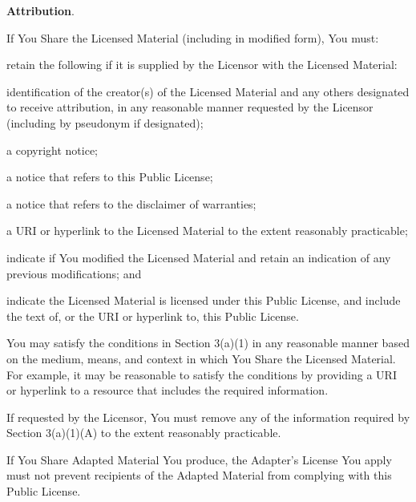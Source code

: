 \begin{doclicense@enumerate}
\item \par \textbf{Attribution}.
\begin{doclicense@enumerate}
\item \par If You Share the Licensed Material (including in modified form), You must:
\begin{doclicense@enumerate}
\item retain the following if it is supplied by the Licensor with the Licensed Material:
\begin{doclicense@enumerate}
\item identification of the creator(s) of the Licensed Material and any others designated to receive attribution, in any reasonable manner requested by the Licensor (including by pseudonym if designated);
\item a copyright notice;
\item a notice that refers to this Public License; 
\item a notice that refers to the disclaimer of warranties;
\item a URI or hyperlink to the Licensed Material to the extent reasonably practicable;
\end{doclicense@enumerate}
\item indicate if You modified the Licensed Material and retain an indication of any previous modifications; and
\item indicate the Licensed Material is licensed under this Public License,
and include the text of, or the URI or hyperlink to, this Public
License.
\end{doclicense@enumerate}

\item You may satisfy the conditions in Section 3(a)(1) in any reasonable manner based on the medium, means, and context in which You Share the Licensed Material. For example, it may be reasonable to satisfy the conditions by providing a URI or hyperlink to a resource that includes the required information.
\item If requested by the Licensor, You must remove any of the information required by Section 3(a)(1)(A) to the extent reasonably practicable.
\item If You Share Adapted Material You produce, the Adapter's License You apply must not prevent recipients of the Adapted Material from complying with this Public License.
\end{doclicense@enumerate}

\end{doclicense@enumerate}
